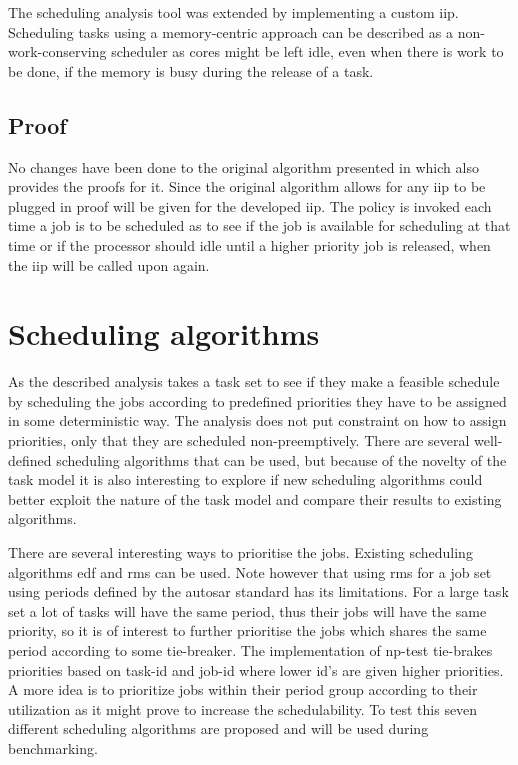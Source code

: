 \documentclass{kththesis}
\begin{document}
The scheduling analysis tool was extended by implementing a custom \acrshort{iip}. Scheduling tasks
using a memory-centric approach can be described as a non-work-conserving scheduler as cores might be
left idle, even when there is work to be done, if the memory is busy during the release of a task. 


\subsection{Proof}

No changes have been done to the original algorithm presented in \parencite{nasri_exact_2017} which
also provides the proofs for it. Since the original algorithm allows for any \acrshort{iip} to be
plugged in proof will be given for the developed \acrshort{iip}. The policy is invoked each time a
job is to be scheduled as to see if the job is available for scheduling at that time or if the
processor should idle until a higher priority job is released, when the \acrshort{iip} will be
called upon again.

%
%




\section{Scheduling algorithms} \label{sec:scheduling_algorithms}

As the described analysis takes a task set to see if they make a feasible schedule by
scheduling the jobs according to predefined priorities they have to be assigned in some
deterministic way. The analysis does not put constraint on how to assign priorities, only that they
are scheduled non-preemptively. There are several well-defined scheduling algorithms that can be
used, but because of the novelty of the task model it is also interesting to explore
if new scheduling algorithms could better exploit the nature of the task model and compare their
results to existing algorithms.

There are several interesting ways to prioritise the jobs. Existing scheduling algorithms
\acrshort{edf} and \acrshort{rms} can be used. Note however that using \acrshort{rms} for a job
set using periods defined by the \acrshort{autosar} standard has its limitations. For a large task
set a lot of tasks will have the same period, thus their jobs will have the same priority, so it is
of interest to further prioritise the jobs which shares the same period according to some
tie-breaker. The implementation of \acrshort{np}-test tie-brakes priorities based on task-id and
job-id where lower id's are given higher priorities. A more  idea is to prioritize jobs within their
period group according to their utilization as it might prove to increase the schedulability. To
test this seven different scheduling algorithms are proposed and will be used during benchmarking.
\end{document}
